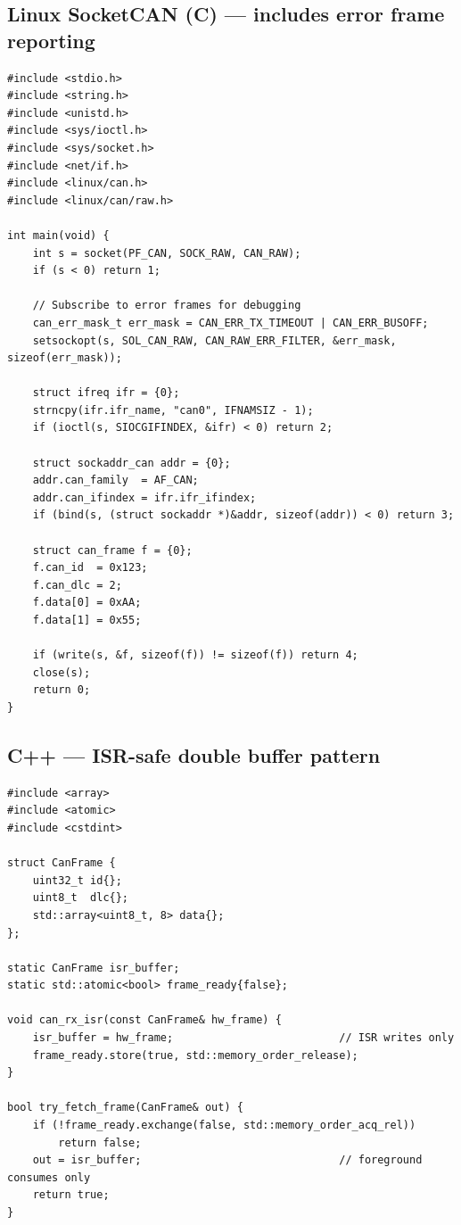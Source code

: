 \documentclass[12pt,a4paper,oneside]{report}
\begin{document}
\subsection{Linux SocketCAN (C) --- includes error frame
reporting}\label{linux-socketcan-c-includes-error-frame-reporting}

\begin{verbatim}
#include <stdio.h>
#include <string.h>
#include <unistd.h>
#include <sys/ioctl.h>
#include <sys/socket.h>
#include <net/if.h>
#include <linux/can.h>
#include <linux/can/raw.h>

int main(void) {
    int s = socket(PF_CAN, SOCK_RAW, CAN_RAW);
    if (s < 0) return 1;

    // Subscribe to error frames for debugging
    can_err_mask_t err_mask = CAN_ERR_TX_TIMEOUT | CAN_ERR_BUSOFF;
    setsockopt(s, SOL_CAN_RAW, CAN_RAW_ERR_FILTER, &err_mask, sizeof(err_mask));

    struct ifreq ifr = {0};
    strncpy(ifr.ifr_name, "can0", IFNAMSIZ - 1);
    if (ioctl(s, SIOCGIFINDEX, &ifr) < 0) return 2;

    struct sockaddr_can addr = {0};
    addr.can_family  = AF_CAN;
    addr.can_ifindex = ifr.ifr_ifindex;
    if (bind(s, (struct sockaddr *)&addr, sizeof(addr)) < 0) return 3;

    struct can_frame f = {0};
    f.can_id  = 0x123;
    f.can_dlc = 2;
    f.data[0] = 0xAA;
    f.data[1] = 0x55;

    if (write(s, &f, sizeof(f)) != sizeof(f)) return 4;
    close(s);
    return 0;
}
\end{verbatim}

\subsection{C++ --- ISR-safe double buffer
pattern}\label{c-isr-safe-double-buffer-pattern}

\begin{verbatim}
#include <array>
#include <atomic>
#include <cstdint>

struct CanFrame {
    uint32_t id{};
    uint8_t  dlc{};
    std::array<uint8_t, 8> data{};
};

static CanFrame isr_buffer;
static std::atomic<bool> frame_ready{false};

void can_rx_isr(const CanFrame& hw_frame) {
    isr_buffer = hw_frame;                          // ISR writes only
    frame_ready.store(true, std::memory_order_release);
}

bool try_fetch_frame(CanFrame& out) {
    if (!frame_ready.exchange(false, std::memory_order_acq_rel))
        return false;
    out = isr_buffer;                               // foreground consumes only
    return true;
}
\end{verbatim}
\end{document}
